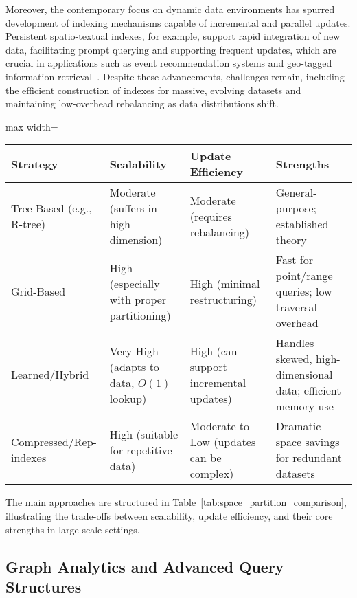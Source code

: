 Moreover, the contemporary focus on dynamic data environments has spurred development of indexing mechanisms capable of incremental and parallel updates. Persistent spatio-textual indexes, for example, support rapid integration of new data, facilitating prompt querying and supporting frequent updates, which are crucial in applications such as event recommendation systems and geo-tagged information retrieval~\cite{ref114,ref118}. Despite these advancements, challenges remain, including the efficient construction of indexes for massive, evolving datasets and maintaining low-overhead rebalancing as data distributions shift.

\begin{table*}[htbp]
\centering
\caption{Comparison of Space-Partitioning Index Strategies for Large-Scale Query Processing}
\label{tab:space_partition_comparison}
\begin{adjustbox}{max width=\textwidth}
\begin{tabular}{llll}
\toprule
\textbf{Strategy} & \textbf{Scalability} & \textbf{Update Efficiency} & \textbf{Strengths} \\
\midrule
Tree-Based (e.g., R-tree) & Moderate (suffers in high dimension) & Moderate (requires rebalancing) & General-purpose; established theory \\
Grid-Based & High (especially with proper partitioning) & High (minimal restructuring) & Fast for point/range queries; low traversal overhead \\
Learned/Hybrid & Very High (adapts to data, $O(1)$ lookup) & High (can support incremental updates) & Handles skewed, high-dimensional data; efficient memory use \\
Compressed/Rep-indexes & High (suitable for repetitive data) & Moderate to Low (updates can be complex) & Dramatic space savings for redundant datasets \\
\bottomrule
\end{tabular}
\end{adjustbox}
\end{table*}

The main approaches are structured in Table~\ref{tab:space_partition_comparison}, illustrating the trade-offs between scalability, update efficiency, and their core strengths in large-scale settings.

\subsection{Graph Analytics and Advanced Query Structures}

